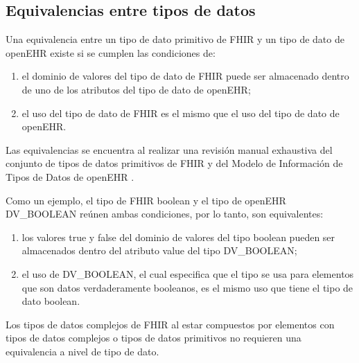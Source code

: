 \subsection{Equivalencias entre tipos de datos}

Una equivalencia entre un tipo de dato primitivo de FHIR y un tipo de dato de openEHR existe si se cumplen las condiciones de:

\begin{enumerate}
  \item el dominio de valores del tipo de dato de FHIR puede ser almacenado dentro de uno de los atributos del tipo de dato de openEHR;
  \item el uso del tipo de dato de FHIR es el mismo que el uso del tipo de dato de openEHR.
\end{enumerate}

Las equivalencias se encuentra al realizar una revisión manual exhaustiva del conjunto de tipos de datos primitivos de FHIR \cite{FHIRDataTypes} y del Modelo de Información de Tipos de Datos de openEHR \cite{openEHRDataTypes}.

Como un ejemplo, el tipo de FHIR boolean y el tipo de openEHR DV\_BOOLEAN reúnen ambas condiciones, por lo tanto, son equivalentes:
\begin{enumerate}
  \item los valores true y false del dominio de valores del tipo boolean pueden ser almacenados dentro del atributo value del tipo DV\_BOOLEAN;
  \item el uso de DV\_BOOLEAN, el cual especifica que el tipo se usa para elementos que son datos verdaderamente booleanos, es el mismo uso que tiene el tipo de dato boolean.
\end{enumerate}

Los tipos de datos complejos de FHIR al estar compuestos por elementos con tipos de datos complejos o tipos de datos primitivos no requieren una equivalencia a nivel de tipo de dato.

